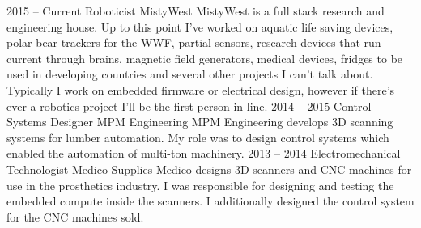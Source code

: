 \documentclass[9pt]{developercv} %
\begin{document}
\hfill %
\begin{minipage}[t]{0.5\textwidth} %
	\vspace{-\baselineskip} %
	\begin{barchart}{5.5}
	\end{barchart}
\end{minipage}


\begin{entrylist}
	\entry
		{2015 -- Current}
		{Roboticist}
		{MistyWest}
		{MistyWest is a full stack research and engineering house. Up to this point I've worked on aquatic life saving devices, polar bear trackers for the WWF, partial sensors, research devices that run current through brains, magnetic field generators, medical devices, fridges to be used in developing countries and several other projects I can't talk about. Typically I work on embedded firmware or electrical design, however if there's ever a robotics project I'll be the first person in line.}
	\entry
		{2014 -- 2015}
		{Control Systems Designer}
		{MPM Engineering}
		{MPM Engineering develops 3D scanning systems for lumber automation. My role was to design control systems which enabled the automation of multi-ton machinery.}
	\entry
		{2013 -- 2014}
		{Electromechanical Technologist}
		{Medico Supplies}
		{Medico designs 3D scanners and CNC machines for use in the prosthetics industry. I was responsible for designing and testing the embedded compute inside the scanners. I additionally designed the control system for the CNC machines sold.}
\end{entrylist}


\end{document}
